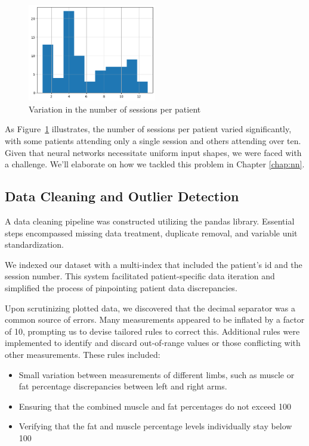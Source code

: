 \begin{figure}[h]
    \centering
    \includegraphics[width=0.5\textwidth]{files/sessions_per_patient}
    \caption{Variation in the number of sessions per patient}
    \label{fig:sessions-per-patient}
\end{figure}

As Figure~\ref{fig:sessions-per-patient} illustrates, the number of sessions
per patient varied significantly, with some patients attending only a single
session and others attending over ten. Given that neural networks necessitate
uniform input shapes, we were faced with a challenge. We'll elaborate on how we
tackled this problem in Chapter \ref{chap:nn}.
\subsection{Data Cleaning and Outlier Detection}

A data cleaning pipeline was constructed utilizing the \gls{pandas} library.
Essential steps encompassed missing data treatment, duplicate removal, and
variable unit standardization.

We indexed our dataset with a multi-index that included the patient's id and
the session number. This system facilitated patient-specific data iteration and
simplified the process of pinpointing patient data discrepancies.

Upon scrutinizing plotted data, we discovered that the decimal separator was a
common source of errors. Many measurements appeared to be inflated by a factor
of 10, prompting us to devise tailored rules to correct this. Additional rules
were implemented to identify and discard out-of-range values or those
conflicting with other measurements. These rules included:

\begin{itemize}
    \item Small variation between measurements of different limbs, such as muscle or fat
          percentage discrepancies between left and right arms.
    \item Ensuring that the combined muscle and fat percentages do not exceed 100%
    \item Verifying that the fat and muscle percentage levels individually stay below 100%
\end{itemize}

